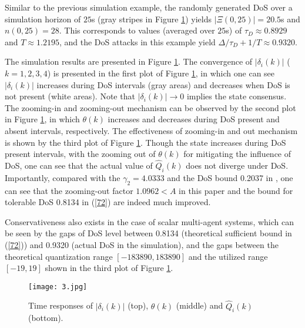 \documentclass[letterpaper,journal,final,twocolumn]{IEEEtran}
\begin{document}
Similar to the previous simulation example, the randomly generated DoS
over a simulation horizon of $25$s (gray stripes in Figure \ref{simulation}) yields $|\Xi(0,25)|=20.5$s and $n(0,25)=28$. 
This corresponds to values (averaged over $25$s) 
of $\tau_D\approx 0.8929$ and $T\approx1.2195$,
and the DoS attacks in this example yield
$
\Delta/\tau_D + 1/T \approx 0.9320
$. 



The simulation results are presented in Figure \ref{simulation}. The convergence of $|\delta_i(k)|$ ($k=1, 2, 3, 4$) is presented in the first plot of Figure \ref{simulation}, in which one can see $|\delta_i(k)|$ increases during DoS intervals (gray areas) and decreases when DoS is not present (white areas). Note that  $|\delta_i(k)|\to 0$ implies the state consensus. The zooming-in and zooming-out mechanism can be observed by the second plot in Figure \ref{simulation}, in which $\theta(k)$ increases and decreases during DoS present and absent intervals, respectively. The effectiveness of zooming-in and out mechanism is shown by the third plot of Figure \ref{simulation}. Though the state increases during DoS present intervals, with the zooming out of $\theta(k)$ for mitigating the influence of DoS, one can see that the actual value of $\hat Q_i(k)$ does not diverge under DoS. 
\color{black}  
Importantly, compared with the $\gamma_2=4.0333$ and the DoS bound 0.2037 in \cite{feng2020ifac}, one can see that the zooming-out factor $ 1.0962<A$ in this paper and the bound for tolerable DoS 0.8134 in (\ref{72}) are indeed much improved. 

Conservativeness also exists in the case of scalar multi-agent systems, which can be seen by the gaps of DoS level between 0.8134 (theoretical sufficient bound in (\ref{72})) and 0.9320 (actual DoS in the simulation), and the gaps between the theoretical quantization range $[-183890, 183890]$ and the utilized range $[-19, 19]$ shown in the third plot of Figure \ref{simulation}. 




\begin{figure}[t]
	\begin{center}
		\vspace{-4mm}
		\texttt{[image: 3.jpg]}  \\
					\vspace{-5mm}
		\linespread{1}\caption{Time responses of $|\delta_i(k)|$ (top), $\theta(k)$ (middle) and $\hat Q _i (k)$ (bottom). } \label{simulation}
	\end{center}
\vspace{-5mm}
\end{figure}
\end{document}
